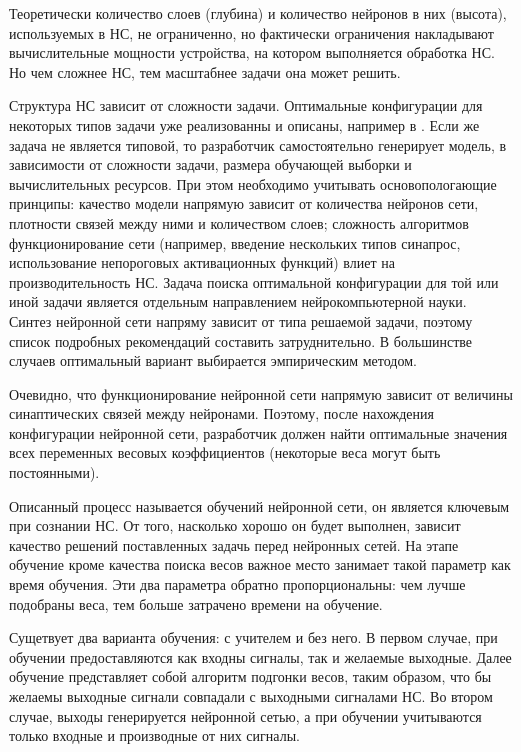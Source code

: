 \documentclass[a4paper,english,russian]{G2-105}
\begin{document}
\par Теоретически количество слоев (глубина) и количество нейронов в них (высота), используемых в НС, не ограниченно, но фактически ограничения накладывают вычислительные мощности устройства, на котором выполняется обработка НС. Но чем сложнее НС, тем масштабнее задачи она может решить. 
\par Структура НС зависит от сложности задачи. Оптимальные конфигурации для некоторых типов задачи уже реализованны и описаны, например в \cite{13}. Если же задача не является типовой, то разработчик самостоятельно генерирует модель, в зависимости от сложности задачи, размера обучающей выборки и вычислительных ресурсов. При этом необходимо учитывать основопологающие принципы: качество модели напрямую зависит от количества нейронов сети, плотности связей между ними и количеством слоев; сложность алгоритмов функционирование сети (например, введение нескольких типов синапрос, использование непороговых активационных функций) влиет на производительность НС. Задача поиска оптимальной конфигурации для той или иной задачи является отдельным направлением нейрокомпьютерной науки. Синтез нейронной сети напряму зависит от типа решаемой задачи, поэтому список подробных рекомендаций составить затруднительно. В большинстве случаев оптимальный вариант выбирается эмпирическим методом.
\par Очевидно, что функционирование нейронной сети напрямую зависит от величины синаптических связей между нейронами. Поэтому, после нахождения конфигурации нейронной сети, разработчик должен найти оптимальные значения всех переменных весовых коэффициентов (некоторые веса могут быть постоянными).
\par Описанный процесс называется обучений нейронной сети, он является ключевым при сознании НС. От того, насколько хорошо он будет выполнен, зависит качество решений поставленных задачь перед нейронных сетей. На этапе обучение кроме качества поиска весов важное место занимает такой параметр как время обучения. Эти два параметра обратно пропорциональны: чем лучше подобраны веса, тем больше затрачено времени на обучение.
\par Сущетвует два варианта обучения: с учителем и без него. В первом случае, при обучении предоставляются как входны сигналы, так и желаемые выходные. Далее обучение представляет собой алгоритм подгонки весов, таким образом, что бы желаемы выходные сигнали совпадали с выходными сигналами НС. Во втором случае, выходы генерируется нейронной сетью, а при обучении учитываются только входные и производные от них сигналы.
\end{document}

